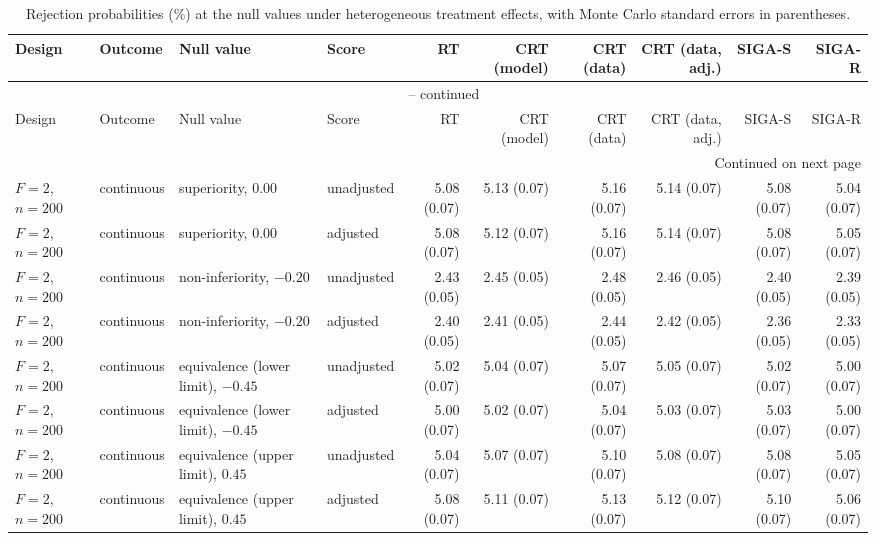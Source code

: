 \documentclass[12pt,a4paper]{article}
\theoremstyle{definition}
\theoremstyle{remark}\newtheorem{remark}{Remark}
\numberwithin{equation}{section}
\begin{document}
\clearpage
\begin{landscape}\begin{singlespace}\begingroup\footnotesize\setlength{\tabcolsep}{3.3pt}\renewcommand{\arraystretch}{1.0}\setlength{\LTcapwidth}{\linewidth}\setlength{\LTleft}{\fill}\setlength{\LTright}{\fill}
\begin{longtable}{@{}llllrrrrrr@{}}
\caption{Rejection probabilities (\%) at the null values under heterogeneous treatment effects, with Monte Carlo standard errors in parentheses.}
\label{tab:supp-hetero-null}\\
\toprule
Design & Outcome & Null value & Score & RT & CRT (model) & CRT (data) & CRT (data, adj.) & SIGA-S & SIGA-R\\
\midrule\endfirsthead
\multicolumn{10}{c}{\tablename\ \thetable{} -- continued}\\\toprule
Design & Outcome & Null value & Score & RT & CRT (model) & CRT (data) & CRT (data, adj.) & SIGA-S & SIGA-R\\
\midrule\endhead
\midrule\multicolumn{10}{r}{Continued on next page}\\\endfoot
\bottomrule\endlastfoot
$F=2$, $n=200$ & continuous & superiority, $0.00$ & unadjusted & 5.08 (0.07) & 5.13 (0.07) & 5.16 (0.07) & 5.14 (0.07) & 5.08 (0.07) & 5.04 (0.07)\\
$F=2$, $n=200$ & continuous & superiority, $0.00$ & adjusted & 5.08 (0.07) & 5.12 (0.07) & 5.16 (0.07) & 5.14 (0.07) & 5.08 (0.07) & 5.05 (0.07)\\
$F=2$, $n=200$ & continuous & non-inferiority, $-0.20$ & unadjusted & 2.43 (0.05) & 2.45 (0.05) & 2.48 (0.05) & 2.46 (0.05) & 2.40 (0.05) & 2.39 (0.05)\\
$F=2$, $n=200$ & continuous & non-inferiority, $-0.20$ & adjusted & 2.40 (0.05) & 2.41 (0.05) & 2.44 (0.05) & 2.42 (0.05) & 2.36 (0.05) & 2.33 (0.05)\\
$F=2$, $n=200$ & continuous & equivalence (lower limit), $-0.45$ & unadjusted & 5.02 (0.07) & 5.04 (0.07) & 5.07 (0.07) & 5.05 (0.07) & 5.02 (0.07) & 5.00 (0.07)\\
$F=2$, $n=200$ & continuous & equivalence (lower limit), $-0.45$ & adjusted & 5.00 (0.07) & 5.02 (0.07) & 5.04 (0.07) & 5.03 (0.07) & 5.03 (0.07) & 5.00 (0.07)\\
$F=2$, $n=200$ & continuous & equivalence (upper limit), $0.45$ & unadjusted & 5.04 (0.07) & 5.07 (0.07) & 5.10 (0.07) & 5.08 (0.07) & 5.08 (0.07) & 5.05 (0.07)\\
$F=2$, $n=200$ & continuous & equivalence (upper limit), $0.45$ & adjusted & 5.08 (0.07) & 5.11 (0.07) & 5.13 (0.07) & 5.12 (0.07) & 5.10 (0.07) & 5.06 (0.07)\\

\end{longtable}
\end{singlespace}
\end{landscape}
\end{document}
